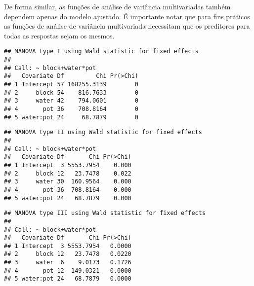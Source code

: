 De forma similar, as funções de análise de variância multivariadas também dependem apenas do modelo ajustado. É importante notar que para fins práticos as funções de análise de variância multivariada necessitam que os preditores para todas as respostas sejam os mesmos.


\begin{knitrout}
\color{fgcolor}\begin{kframe}
\begin{alltt}
\end{alltt}
\begin{verbatim}
## MANOVA type I using Wald statistic for fixed effects
## 
## Call: ~ block+water*pot
##   Covariate Df         Chi Pr(>Chi)
## 1 Intercept 57 168255.3139        0
## 2     block 54    816.7633        0
## 3     water 42    794.0601        0
## 4       pot 36    708.8164        0
## 5 water:pot 24     68.7879        0
\end{verbatim}
\end{kframe}
\end{knitrout}


\begin{knitrout}
\color{fgcolor}\begin{kframe}
\begin{alltt}
\end{alltt}
\begin{verbatim}
## MANOVA type II using Wald statistic for fixed effects
## 
## Call: ~ block+water*pot
##   Covariate Df       Chi Pr(>Chi)
## 1 Intercept  3 5553.7954    0.000
## 2     block 12   23.7478    0.022
## 3     water 30  160.9564    0.000
## 4       pot 36  708.8164    0.000
## 5 water:pot 24   68.7879    0.000
\end{verbatim}
\end{kframe}
\end{knitrout}


\begin{knitrout}
\color{fgcolor}\begin{kframe}
\begin{alltt}
\end{alltt}
\begin{verbatim}
## MANOVA type III using Wald statistic for fixed effects
## 
## Call: ~ block+water*pot
##   Covariate Df       Chi Pr(>Chi)
## 1 Intercept  3 5553.7954   0.0000
## 2     block 12   23.7478   0.0220
## 3     water  6    9.0173   0.1726
## 4       pot 12  149.0321   0.0000
## 5 water:pot 24   68.7879   0.0000
\end{verbatim}
\end{kframe}
\end{knitrout}

